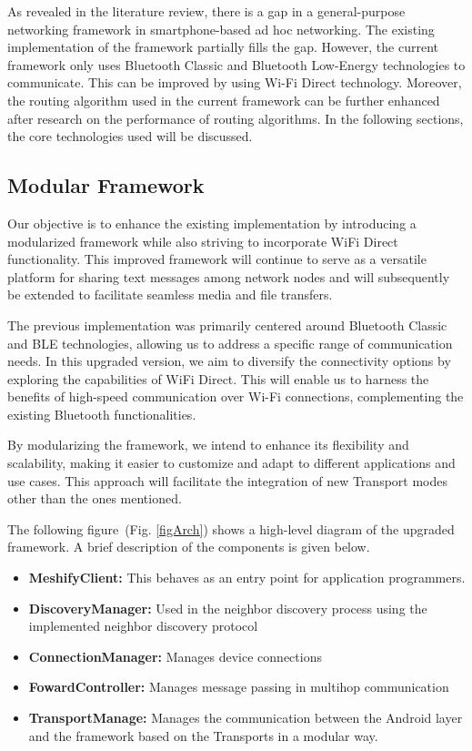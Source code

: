 \documentclass[12pt, conference, onecolumn, a4paper]{IEEEtran}
\begin{document}
As revealed in the literature review, there is a gap in a general-purpose
networking framework in smartphone-based ad hoc networking. The existing
implementation of the framework partially fills the gap. However, the current
framework only uses Bluetooth Classic and Bluetooth Low-Energy technologies to
communicate. This can be improved by using Wi-Fi Direct technology. Moreover,
the routing algorithm used in the current framework can be further enhanced
after research on the performance of routing algorithms. In the following
sections, the core technologies used will be discussed.

\subsection{Modular Framework}

Our objective is to enhance the existing implementation by introducing a
modularized framework while also striving to incorporate WiFi Direct
functionality. This improved framework will continue to serve as a versatile
platform for sharing text messages among network nodes and will subsequently be
extended to facilitate seamless media and file transfers.

The previous implementation was primarily centered around Bluetooth Classic and
BLE technologies, allowing us to address a specific range of communication
needs. In this upgraded version, we aim to diversify the connectivity options
by exploring the capabilities of WiFi Direct. This will enable us to harness
the benefits of high-speed communication over Wi-Fi connections, complementing
the existing Bluetooth functionalities.

By modularizing the framework, we intend to enhance its flexibility and
scalability, making it easier to customize and adapt to different applications
and use cases. This approach will facilitate the integration of new Transport
modes other than the ones mentioned.

The following figure~(Fig. \ref{figArch}) shows a high-level diagram of the
upgraded
framework. A brief description of the components is given below.

\begin{itemize}
    \item \textbf{MeshifyClient:} This behaves as an entry point for
          application programmers.
    \item \textbf{DiscoveryManager:} Used in the neighbor discovery process
          using the implemented neighbor discovery protocol
    \item \textbf{ConnectionManager:} Manages device connections
    \item \textbf{FowardController:} Manages message passing in multihop
          communication
    \item \textbf{TransportManage:} Manages the communication between the
          Android layer and the framework based on the Transports in a modular
          way.
\end{itemize}
\end{document}
